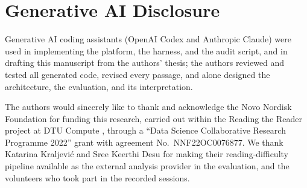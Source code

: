 \documentclass[sigconf,screen]{acmart}
\begin{document}
\section*{Generative AI Disclosure}
Generative AI coding assistants (OpenAI Codex and Anthropic Claude) were used in implementing the platform, the harness, and the audit script, and in drafting this manuscript from the authors' thesis; the authors reviewed and tested all generated code, revised every passage, and alone designed the architecture, the evaluation, and its interpretation.

\begin{acks}
The authors would sincerely like to thank and acknowledge the Novo Nordisk Foundation for funding this research, carried out within the Reading the Reader project at DTU Compute \cite{dtucompute2025rtr, nnf2023rtr}, through a ``Data Science Collaborative Research Programme 2022'' grant with agreement No.~NNF22OC0076877.
We thank Katarina Kraljevi\'{c} and Sree Keerthi Desu for making their reading-difficulty pipeline available as the external analysis provider in the evaluation, and the volunteers who took part in the recorded sessions.
\end{acks}



\end{document}
